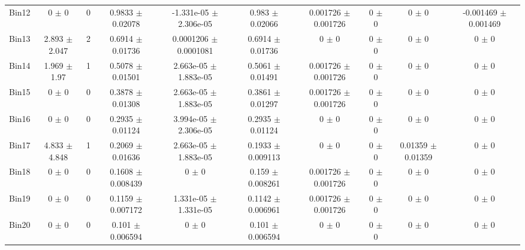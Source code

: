 \begin{tabular}{@{\extracolsep{4pt}}lccccccccc@{}}
     Bin12 & 0 $\pm$ 0 & 0 & 0.9833 $\pm$ 0.02078 & -1.331e-05 $\pm$ 2.306e-05 & 0.983 $\pm$ 0.02066 & 0.001726 $\pm$ 0.001726 & 0 $\pm$ 0 & 0 $\pm$ 0 & -0.001469 $\pm$ 0.001469 \\ 
     Bin13 & 2.893 $\pm$ 2.047 & 2 & 0.6914 $\pm$ 0.01736 & 0.0001206 $\pm$ 0.0001081 & 0.6914 $\pm$ 0.01736 & 0 $\pm$ 0 & 0 $\pm$ 0 & 0 $\pm$ 0 & 0 $\pm$ 0 \\ 
     Bin14 & 1.969 $\pm$ 1.97 & 1 & 0.5078 $\pm$ 0.01501 & 2.663e-05 $\pm$ 1.883e-05 & 0.5061 $\pm$ 0.01491 & 0.001726 $\pm$ 0.001726 & 0 $\pm$ 0 & 0 $\pm$ 0 & 0 $\pm$ 0 \\ 
     Bin15 & 0 $\pm$ 0 & 0 & 0.3878 $\pm$ 0.01308 & 2.663e-05 $\pm$ 1.883e-05 & 0.3861 $\pm$ 0.01297 & 0.001726 $\pm$ 0.001726 & 0 $\pm$ 0 & 0 $\pm$ 0 & 0 $\pm$ 0 \\ 
     Bin16 & 0 $\pm$ 0 & 0 & 0.2935 $\pm$ 0.01124 & 3.994e-05 $\pm$ 2.306e-05 & 0.2935 $\pm$ 0.01124 & 0 $\pm$ 0 & 0 $\pm$ 0 & 0 $\pm$ 0 & 0 $\pm$ 0 \\ 
     Bin17 & 4.833 $\pm$ 4.848 & 1 & 0.2069 $\pm$ 0.01636 & 2.663e-05 $\pm$ 1.883e-05 & 0.1933 $\pm$ 0.009113 & 0 $\pm$ 0 & 0 $\pm$ 0 & 0.01359 $\pm$ 0.01359 & 0 $\pm$ 0 \\ 
     Bin18 & 0 $\pm$ 0 & 0 & 0.1608 $\pm$ 0.008439 & 0 $\pm$ 0 & 0.159 $\pm$ 0.008261 & 0.001726 $\pm$ 0.001726 & 0 $\pm$ 0 & 0 $\pm$ 0 & 0 $\pm$ 0 \\ 
     Bin19 & 0 $\pm$ 0 & 0 & 0.1159 $\pm$ 0.007172 & 1.331e-05 $\pm$ 1.331e-05 & 0.1142 $\pm$ 0.006961 & 0.001726 $\pm$ 0.001726 & 0 $\pm$ 0 & 0 $\pm$ 0 & 0 $\pm$ 0 \\ 
     Bin20 & 0 $\pm$ 0 & 0 & 0.101 $\pm$ 0.006594 & 0 $\pm$ 0 & 0.101 $\pm$ 0.006594 & 0 $\pm$ 0 & 0 $\pm$ 0 & 0 $\pm$ 0 & 0 $\pm$ 0 \\ 
\hline\hline
  \end{tabular}
